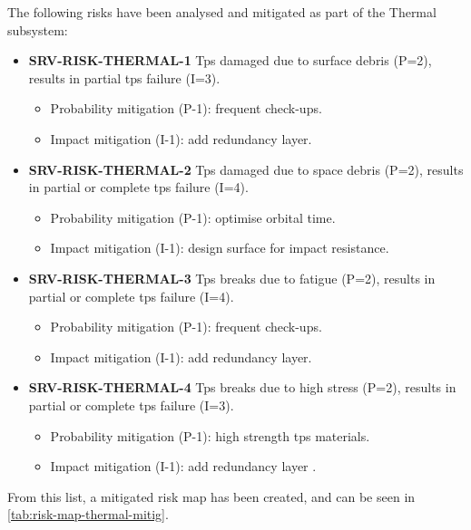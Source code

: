 \noindent The following risks have been analysed and mitigated as part of the Thermal subsystem:

\begin{itemize}
	 \item \textbf{SRV-RISK-THERMAL-1} Tps damaged due to surface debris (P=2), results in partial tps failure (I=3).
	\begin{itemize}
		 \item Probability mitigation (P-1):  frequent check-ups.		 \item Impact mitigation (I-1):  add redundancy layer.	\end{itemize}
	 \item \textbf{SRV-RISK-THERMAL-2} Tps damaged due to space debris (P=2), results in partial or complete tps failure (I=4).
	\begin{itemize}
		 \item Probability mitigation (P-1):  optimise orbital time.		 \item Impact mitigation (I-1): design surface for impact resistance.	\end{itemize}
	 \item \textbf{SRV-RISK-THERMAL-3} Tps breaks due to fatigue (P=2), results in partial or complete tps failure (I=4).
	\begin{itemize}
		 \item Probability mitigation (P-1):  frequent check-ups.		 \item Impact mitigation (I-1):  add redundancy layer.	\end{itemize}
	 \item \textbf{SRV-RISK-THERMAL-4} Tps breaks due to high stress (P=2), results in partial or complete tps failure (I=3).
	\begin{itemize}
		 \item Probability mitigation (P-1):  high strength tps materials.		 \item Impact mitigation (I-1):  add redundancy layer .	\end{itemize}
\end{itemize}

\noindent From this list, a mitigated risk map has been created, and can be seen in \autoref{tab:risk-map-thermal-mitig}.

